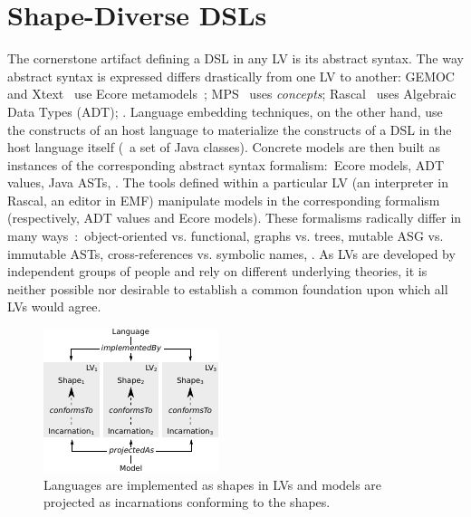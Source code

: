 \section{Shape-Diverse DSLs}
\label{sec:shapes}

The cornerstone artifact defining a DSL in any LV is its abstract syntax.
The way abstract syntax is expressed differs drastically from one LV to another: GEMOC~\cite{bousse2016execution} and Xtext~\cite{bettini2016implementing} use Ecore metamodels~\cite{steinberg2008emf}; MPS~\cite{voelter2014generic} uses \emph{concepts}; Rascal~\cite{klint2010easy} uses Algebraic Data Types (ADT); \etc.
Language embedding techniques, on the other hand, use the constructs of an host language to materialize the constructs of a DSL in the host language itself (\eg~a set of Java classes).
Concrete models are then built as instances of the corresponding abstract syntax formalism:~Ecore models, ADT values, Java ASTs, \etc.
The tools defined within a particular LV (an interpreter in Rascal, an editor in EMF) manipulate models in the corresponding formalism (respectively, ADT values and Ecore models).
These formalisms radically differ in many ways~\cite{klint2016model}:~object-oriented vs. functional, graphs vs. trees, mutable ASG vs. immutable ASTs, cross-references vs. symbolic names, \etc.
As LVs are developed by independent groups of people and rely on different underlying theories, it is neither possible nor desirable to establish a common foundation upon which all LVs would agree.

\begin{figure}[bt]
	\centering
	\includegraphics[width=.7\columnwidth]{figures/shape-diverse-lang-3}
	\caption{Languages are implemented as shapes in LVs and models are projected as incarnations conforming to the shapes.}
	\label{fig:concepts}
\end{figure}

